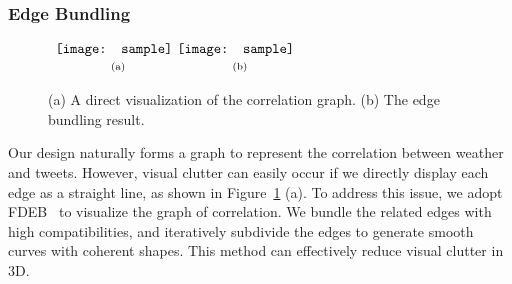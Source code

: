 


\subsubsection{Edge Bundling}
\label{sec:line}

\begin{figure}[t]
\begin{center}
$\begin{array}{c@{\hspace{0.01\linewidth}}c}
\texttt{[image: sample]} &
\texttt{[image: sample]}
\\
\mbox{\small{(a)}} & \mbox{\small{(b)}}
\end{array}$
\end{center}
\vspace{-.1in}
\caption{(a) A direct visualization of the correlation graph. (b) The edge bundling result.}
\label{fig:compareline}
\end{figure}

Our design naturally forms a graph to represent the correlation between weather and tweets. However, visual clutter can easily occur if we directly display each edge as a straight line, as shown in Figure~\ref{fig:compareline} (a). 
%
To address this issue, we adopt FDEB~\cite{holten2009force} to visualize the graph of correlation. We bundle the related edges with high compatibilities, and iteratively subdivide the edges to generate smooth curves with coherent shapes. This method can effectively reduce visual clutter in 3D.

